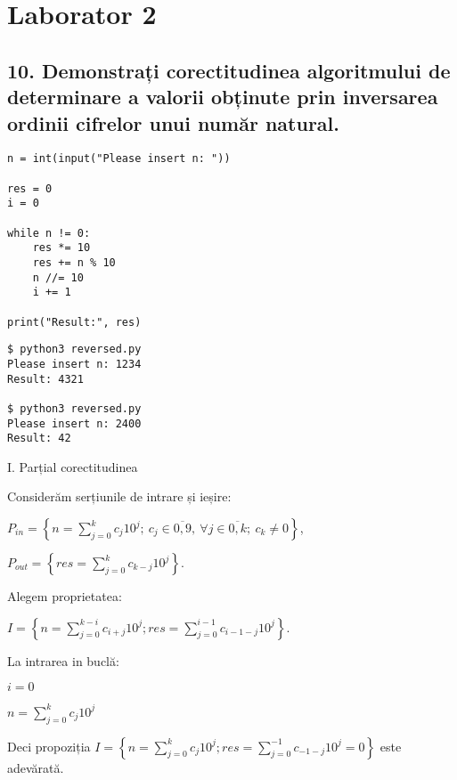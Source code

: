 \documentclass[11pt]{article}
\begin{document}
\section*{Laborator 2}
\label{sec:orgbed30ee}
\subsection*{10. Demonstrați corectitudinea algoritmului de determinare a valorii obținute prin inversarea ordinii cifrelor unui număr natural.}
\label{sec:orga771839}

\begin{verbatim}
n = int(input("Please insert n: "))

res = 0
i = 0

while n != 0:
    res *= 10
    res += n % 10
    n //= 10
    i += 1

print("Result:", res)
\end{verbatim}

\begin{verbatim}
$ python3 reversed.py
Please insert n: 1234
Result: 4321

$ python3 reversed.py
Please insert n: 2400
Result: 42
\end{verbatim}


\noindent
I. Parțial corectitudinea
\newline

Considerăm serțiunile de intrare și ieșire:

$P_{in} = \left\{ n = \sum\limits_{j=0}^{k} c_{j}10^{j};\ 
                c_{j} \in \overline{0,9} ,\ \forall j \in \overline{0,k};\ 
                c_{k} \neq 0 \right\}$,

$P_{out} = \left\{ \mathit{res} = \sum\limits_{j=0}^{k} c_{k-j}10^{j} \right\}$.

\vspace{14pt}
Alegem proprietatea:

$I = \left\{
              n = \sum\limits_{j=0}^{k-i}c_{i+j}10^{j};
              \mathit{res} = \sum\limits_{j=0}^{i-1}c_{i-1-j}10^{j}
 \right\}$.

\vspace{14pt}
La intrarea in buclă:

$i = 0$

$n = \sum\limits_{j=0}^{k}c_{j}10^{j}$

Deci propoziția
$I = \left\{
              n = \sum\limits_{j=0}^{k}c_{j}10^{j};
              \mathit{res} = \sum\limits_{j=0}^{-1}c_{-1-j}10^{j} = 0
      \right\}$ 
 este adevărată.
\end{document}
